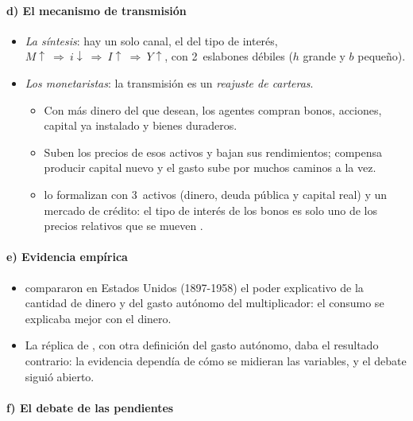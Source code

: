 \documentclass[11pt]{article}
\begin{document}
\paragraph{d) El mecanismo de transmisión}

\begin{itemize}
\item \emph{La síntesis}: hay un solo canal, el del tipo de interés, $M\uparrow\ \Rightarrow\ i\downarrow\ \Rightarrow\ I\uparrow\ \Rightarrow\ Y\uparrow$, con 2~eslabones débiles ($h$ grande y $b$ pequeño).
\item \emph{Los monetaristas}: la transmisión es un \emph{reajuste de carteras}.
  \begin{itemize}
  \item Con más dinero del que desean, los agentes compran bonos, acciones, capital ya instalado y bienes duraderos.
  \item Suben los precios de esos activos y bajan sus rendimientos; compensa producir capital nuevo y el gasto sube por muchos caminos a la vez.
  \item \textcite{BrunnerMeltzer1972Money} lo formalizan con 3~activos (dinero, deuda pública y capital real) y un mercado de crédito: el tipo de interés de los bonos es solo uno de los precios relativos que se mueven\nocite{Meltzer1995Monetary} .
  \end{itemize}
\end{itemize}

\paragraph{e) Evidencia empírica}

\begin{itemize}
\item \textcite{FriedmanMeiselman1963Relative} compararon en Estados Unidos (1897-1958) el poder explicativo de la cantidad de dinero y del gasto autónomo del multiplicador: el consumo se explicaba mejor con el dinero.
\item La réplica de \textcite{AndoModigliani1965Relative}, con otra definición del gasto autónomo, daba el resultado contrario: la evidencia dependía de cómo se midieran las variables, y el debate siguió abierto.
\end{itemize}

\paragraph{f) El debate de las pendientes}
\end{document}
